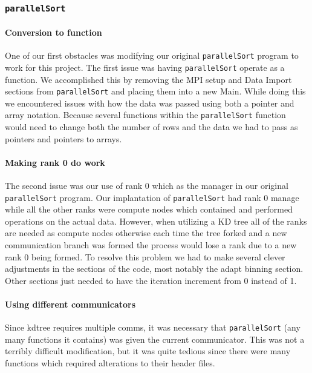 \documentclass{article}
\begin{document}
\subsubsection{\texttt{parallelSort}}


\paragraph{Conversion to function}
One of our first obstacles was modifying our original \texttt{parallelSort}  program to work for this project. The first issue was having \texttt{parallelSort} operate as a function. We accomplished this by removing the MPI setup and Data Import sections from \texttt{parallelSort} and placing them into a new Main. While doing this we encountered issues with how the data was passed using both a pointer and array notation. Because several functions within the \texttt{parallelSort} function would need to change both the number of rows and the data we had to pass as pointers and pointers to arrays. 


\paragraph{Making rank 0 do work}
The second issue was our use of rank 0 which as the manager in our original \texttt{parallelSort} program. Our implantation of \texttt{parallelSort} had rank 0 manage while all the other ranks were compute nodes which contained and performed operations on the actual data. However, when utilizing a KD tree all of the ranks are needed as compute nodes otherwise each time the tree forked and a new communication branch was formed the process would lose a rank due to a new rank 0 being formed. To resolve this problem we had to make several clever adjustments in the sections of the code, most notably the adapt binning section. Other sections just needed to have the iteration increment from 0 instead of 1.

\paragraph{Using different communicators}
Since kdtree requires multiple comms, it was necessary that \texttt{parallelSort} (any many functions it contains) was given the current communicator. This was not a terribly difficult modification, but it was quite tedious since there were many functions which required alterations to their header files.
\end{document}
